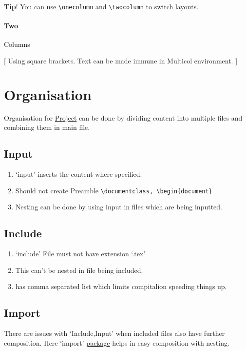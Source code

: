 \documentclass{report}[a4paper,12pt] %
\begin{document}
\begin{tcolorbox}
  \textbf{Tip}! You can use \verb|\onecolumn| and \verb|\twocolumn| to switch layouts.
\end{tcolorbox}

\paragraph{Two} Columns
\begin{multicols}{2}
  \setlength{\columnseprule}{1pt}
  \def\columnseprulecolor{\color{blue}}

  [
  Using square brackets. Text can be made immune in Multicol environment.
  ]
  \lipsum[2]
\end{multicols}

\section{Organisation}
Organisation for \href{https://www.overleaf.com/learn/latex/Management_in_a_large_project}{Project} can be done by dividing content into multiple files
and combining them in main file.

\subsection{Input}
\begin{enumerate}
  \item `input' inserts the content where specified.
  \item Should not create Preamble \verb|\documentclass, \begin{document}|
  \item Nesting can be done by using input in files which are being inputted.
\end{enumerate}

\subsection{Include}
\begin{enumerate}
  \item `include' File must not have extension `.tex'
  \item This can't be nested in file being included.
  \item \verb|| has comma separated list which limits compitalion speeding things up.
\end{enumerate}

\subsection{Import}
There are issues with `Include,Input' when included files also have further composition. Here `import' \href{https://mirror.niser.ac.in/ctan/macros/latex/contrib/import/import.pdf}{package} helps in easy composition with nesting. 
\end{document}
